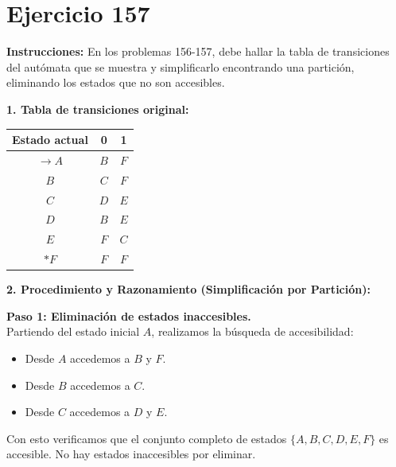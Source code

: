 \documentclass[12pt]{article}
\begin{document}
\begin{center}
\end{center}

\section*{Ejercicio 157}

\textbf{Instrucciones:} En los problemas 156-157, debe hallar la tabla de transiciones del autómata que se muestra y simplificarlo encontrando una partición, eliminando los estados que no son accesibles.

\vspace{0.5cm}

\textbf{1. Tabla de transiciones original:}

\begin{center}
\begin{tabular}{|c|c|c|}
\hline
\textbf{Estado actual} & \textbf{0} & \textbf{1} \\
\hline
$\rightarrow A$ & $B$ & $F$ \\
\hline
$B$ & $C$ & $F$ \\
\hline
$C$ & $D$ & $E$ \\
\hline
$D$ & $B$ & $E$ \\
\hline
$E$ & $F$ & $C$ \\
\hline
$*F$ & $F$ & $F$ \\
\hline
\end{tabular}
\end{center}

\vspace{0.5cm}

\textbf{2. Procedimiento y Razonamiento (Simplificación por Partición):}

\textbf{Paso 1: Eliminación de estados inaccesibles.} \\
Partiendo del estado inicial $A$, realizamos la búsqueda de accesibilidad:
\begin{itemize}
    \item Desde $A$ accedemos a $B$ y $F$.
    \item Desde $B$ accedemos a $C$.
    \item Desde $C$ accedemos a $D$ y $E$.
\end{itemize}
Con esto verificamos que el conjunto completo de estados $\{A, B, C, D, E, F\}$ es accesible. No hay estados inaccesibles por eliminar.
\end{document}
